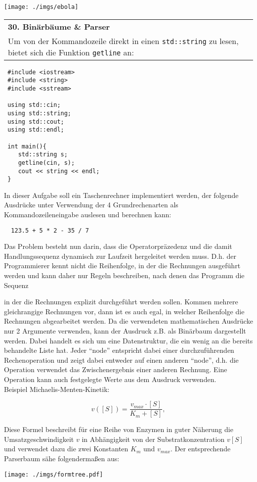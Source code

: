 \documentclass[paper=A4, pagesize, DIV=calc, smallheadings,
fontsize=11pt, expansion=false]{scrreprt}
\begin{document}
\begin{minipage}[H]{0.3\linewidth}
\texttt{[image: ./imgs/ebola]}
\end{minipage}
\begin{tabular}{m{30em}}
\textbf{30. Binärbäume \& Parser} \\  
Um von der Kommandozeile direkt in einen \texttt{std::string} zu lesen, bietet sich die Funktion \texttt{getline} an:
\end{tabular}
\begin{verbatim}
 #include <iostream>
 #include <string>
 #include <sstream>

 using std::cin;
 using std::string;
 using std::cout;
 using std::endl;

 int main(){
    std::string s;
    getline(cin, s);
    cout << string << endl;
 }
\end{verbatim}
In dieser Aufgabe soll ein Taschenrechner implementiert werden, der folgende Ausdrücke unter Verwendung der 4 Grundrechenarten als Kommandozeileneingabe auslesen und berechnen kann:
\begin{verbatim}
  123.5 + 5 * 2 - 35 / 7
\end{verbatim}
Das Problem besteht nun darin, dass die Operatorpräzedenz und die damit Handlungssequenz dynamisch zur Laufzeit hergeleitet werden muss.
D.h. der Programmierer kennt nicht die Reihenfolge, in der die Rechnungen ausgeführt werden und kann daher nur Regeln beschreiben, nach denen das Programm die Sequenz 

 in der die Rechnungen explizit durchgeführt werden sollen. Kommen mehrere gleichrangige Rechnungen vor, dann ist es auch egal, in welcher Reihenfolge die Rechnungen abgearbeitet werden.
Da die verwendeten mathematischen Ausdrücke nur 2 Argumente verwenden,
kann der Ausdruck z.B. als Binärbaum dargestellt werden. Dabei handelt es sich um eine Datenstruktur, die ein wenig an die bereits behandelte Liste hat.
Jeder ``node'' entspricht dabei einer durchzuführenden Rechenoperation und zeigt dabei entweder auf einen anderen ``node'', d.h. die Operation verwendet das Zwischenergebnis einer anderen Rechnung.
Eine Operation kann auch festgelegte Werte aus dem Ausdruck verwenden.
\\
Beispiel Michaelis-Menten-Kinetik:

\[ v([S]) = \frac{v_{max} \cdot [S]}{K_m + [S]},\]

Diese Formel beschreibt für eine Reihe von Enzymen in guter Näherung die Umsatzgeschwindigkeit $v$ in Abhängigkeit von der Substratkonzentration $v[S]$ und verwendet dazu die zwei Konstanten $K_m$ und $v_{max}$. 
Der entsprechende Parserbaum sähe folgendermaßen aus:
\begin{center}
\texttt{[image: ./imgs/formtree.pdf]}
\end{center}
\end{document}
